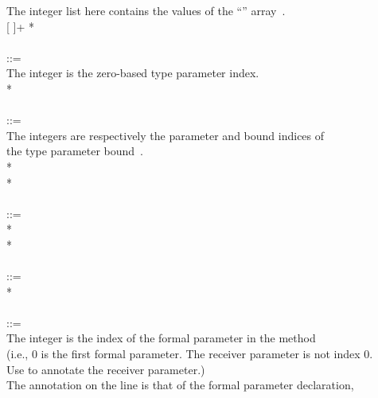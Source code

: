 \documentclass{article}
\begin{document}
\begin{tabbing}
\qquad    \bnfcmt The integer list here contains the values of the ``'' array~\cite{JSR308}. \\ %
\qquad    {}  [ \bnflit{,}  ]+ \bnflit{:} * \lineend \\
\\
 ::= \\
\qquad    \bnfcmt The integer is the zero-based type parameter index. \\
\qquad    {}  \bnflit{:} * \lineend\\
\\
 ::= \\
\qquad    \bnfcmt The integers are respectively the parameter and bound indices of \\
\qquad    \bnfcmt the type parameter bound~\cite{JSR308}. \\
\qquad    {}  \bnflit{\&}  \bnflit{:}
* \lineend \\
\qquad    {}* \\
\\
 ::=  \\
\qquad    {} * \lineend \\
\qquad        {}* \\
\\
 ::=  \\
\qquad    {} * \lineend \\
\\
 ::= \\
\qquad    \bnfcmt The integer is the index of the formal parameter in the method \\
\qquad    \bnfcmt (i.e., 0 is the first formal parameter. The receiver parameter is not index 0. \\
\qquad    \bnfcmt Use  to annotate the receiver parameter.) \\
\qquad    \bnfcmt The annotation on the  line is that of the formal parameter declaration, \\

\end{tabbing}
\end{document}
